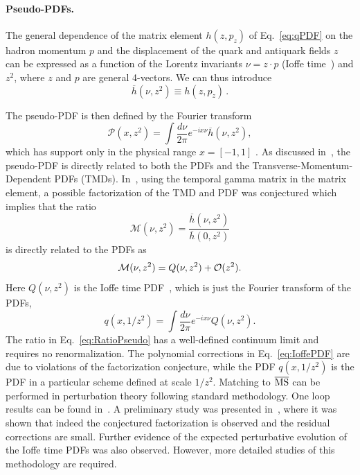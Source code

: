 
\paragraph*{Pseudo-PDFs.} 
The general dependence of the  matrix element $h(z,p_z)$ of Eq.~\eqref{eq:qPDF} 
on the hadron momentum $p$ and the displacement of the quark and antiquark 
fields $z$ can be expressed as a function of the Lorentz invariants 
$\nu=z\cdot p$ (Ioffe time~\cite{Ioffe:1969kf,Braun:1994jq}) 
and $z^2$, where $z$ and $p$ are general 4-vectors.  
%
We can thus introduce
\begin{equation}
\overline{h}(\nu,z^2) \equiv h(z,p_z)\,.
\end{equation}

The pseudo-PDF is then defined by the Fourier transform
%
\begin{equation}
{\mathcal P}(x,z^2)=\int \frac{d\nu}{2\pi} e^{-ix\nu} \overline{h}(\nu,z^2),
\end{equation}
which has support only in the physical range 
$x=[-1,1]$ \cite{Radyushkin:2016hsy,Radyushkin:2017cyf}. 
%
As discussed in~\cite{Radyushkin:2016hsy,Radyushkin:2017cyf}, the pseudo-PDF 
is directly related to both the PDFs and the 
Transverse-Momentum-Dependent PDFs (TMDs).
%
In~\cite{Radyushkin:2017cyf}, using the temporal gamma matrix in the matrix 
element, a possible factorization of the TMD and PDF was conjectured which 
implies that the ratio
%
\begin{equation}
{\mathcal M}(\nu,z^2) =\frac{\overline h(\nu,z^2)}{\overline h(0,z^2)}
\label{eq:RatioPseudo}
\end{equation}
is directly related to the PDFs as 
\begin{equation}
{\mathcal M}(\nu,z^2) =Q(\nu,z^2) + {\cal O}(z^2).
\label{eq:IoffePDF}
\end{equation}
%
Here $Q(\nu,z^2)$ is the Ioffe time PDF~\cite{Ioffe:1969kf,Braun:1994jq}, 
which is just the Fourier transform of the PDFs,
\begin{equation}
{q}(x,1/z^2)=\int \frac{d\nu}{2\pi} e^{-ix\nu} Q(\nu,z^2).
\end{equation}
%
The ratio in Eq.~\eqref{eq:RatioPseudo} has a well-defined continuum 
limit and requires no renormalization. 
%
The polynomial corrections in Eq.~\eqref{eq:IoffePDF} are due to violations of 
the factorization conjecture, while the PDF ${q}(x,1/z^2)$ is the PDF in a 
particular scheme defined at scale $1/z^2$. Matching to $\overline{\rm MS}$ 
can be performed in perturbation theory following standard methodology. 
%
One loop results can be found in~\cite{Ji:2017rah,Radyushkin:2017lvu}.
%
A preliminary study was presented in~\cite{Orginos:2017kos,Karpie:2017bzm}, 
where it was shown that indeed the conjectured factorization is observed and 
the residual corrections are small. 
%
Further  evidence of the expected 
perturbative evolution of the Ioffe time PDFs was also observed. 
%
However, more detailed studies of this methodology are required.  
